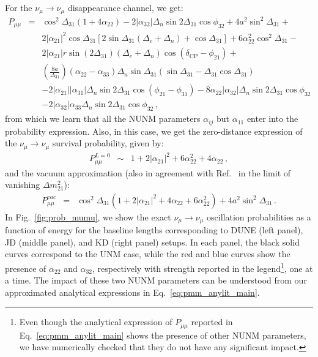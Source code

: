 \documentclass[11pt,a4paper]{article}
\newcommand{\amm}{\ensuremath{\alpha_{22}}}
\newcommand{\atm}{\ensuremath{\alpha_{32}}}
\begin{document}
For the $\nu_\mu\rightarrow\nu_{\mu}$ disappearance channel, we get:
\begin{eqnarray}
 P_{\mu \mu} &=&\cos^2\Delta_{31} (1+ 4 \alpha_{22})-2 |\alpha_{32}| \Delta_n \sin2\Delta_{31} \cos\phi_{32} + 4 a^2 \sin^2\Delta_{31} + \nonumber \\
 && 2 |\alpha_{21}|^2 \cos\Delta_{31} \left[2 \sin\Delta_{31}(\Delta_e+\Delta_n)+\cos\Delta_{31}\right] + 6 \alpha_{22}^2 \cos^2\Delta_{31} - \nonumber \\
 &&2 |\alpha_{21}| r \sin (2 \Delta_{31}) (\Delta_e+\Delta_n) \cos(\delta_{\mathrm{CP}}-\phi_{21}) + \nonumber\\
 &&\left(\frac{8 a}{\Delta_{31}}\right)(\alpha_{22}-\alpha_{33}) \Delta_n \sin \Delta_{31} (\sin \Delta_{31}-\Delta_{31} 
 \cos \Delta_{31}) \nonumber \\
 &&-2 |\alpha_{21}| |\alpha_{31}| \Delta_n  \sin2 \Delta_{31} \cos (\phi_{21}-\phi_{31})
 -8 \alpha_{22} |\alpha_{32}| \Delta_n\sin2\Delta_{31} \cos\phi_{32} \nonumber \\
 &&-2 |\alpha_{32}| \alpha_{33} \Delta_{n} \sin2\Delta_{31}\cos\phi_{32}\,, \label{eq:pmm_anylit_main}
\end{eqnarray}
from which we learn that all the NUNM parameters $\alpha_{ij}$ but $\alpha_{11}$ enter into the probability expression. Also, in this case, we get the zero-distance expression of the $\nu_{\mu}\rightarrow\nu_{\mu}$ survival probability, given by:
\begin{eqnarray} \label{pmmzero}
P_{\mu\mu}^{L = 0} &\sim& 1+ 2 |\alpha_{21}|^2+6 \alpha_{22}^2+4 \alpha_{22}\,,
\end{eqnarray}
and the vacuum approximation (also in agreement with Ref.~\cite{Escrihuela:2015wra} in the limit of vanishing $\Delta m^2_{21}$):
\begin{eqnarray}
P_{\mu\mu}^{vac}&=& \cos^2\Delta_{31} \left(1+2 |\alpha _{21}|^2 +4 \alpha_{22}+ 6\alpha_{22}^2 \right) + 4 a^2 \sin ^2\Delta_{31}\,. \label{pmmvacuum}
\end{eqnarray}
In Fig.~\ref{fig:prob_mumu}, we show the exact $\nu_{\mu}\rightarrow\nu_{\mu}$ oscillation probabilities as a function of energy for the baseline lengths corresponding to DUNE (left panel), JD (middle panel), and KD (right panel) setups. In each panel, the black solid curves  correspond to the UNM case, while the red and blue curves show the presence of $\amm$ and $\atm$, respectively with strength reported in the legend\footnote{Even though the analytical expression of $P_{\mu\mu}$ reported in Eq.~\ref{eq:pmm_anylit_main} shows the presence of other NUNM parameters,
we have numerically checked that they do not have any significant impact.}, one at a time. The impact of these two NUNM parameters can be understood from our approximated analytical expressions in Eq.~\ref{eq:pmm_anylit_main}.
\end{document}
